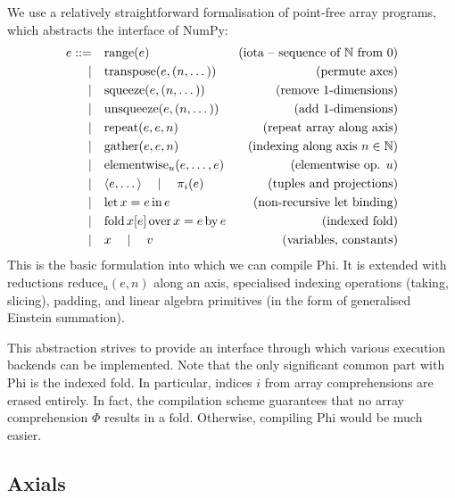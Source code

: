 
We use a relatively straightforward formalisation of point-free array programs, which abstracts the interface of NumPy:
\begin{align*}
e ::=&\quad \mathrm{range}(e)   &\text{(iota -- sequence of }\mathbb N\text{ from }0\text{)} \\
\mid&\quad \mathrm{transpose}(e, (n, \dots)) &\text{(permute axes)} \\ 
\mid&\quad \mathrm{squeeze}(e, (n, \dots)) &\text{(remove 1-dimensions)} \\
\mid&\quad \mathrm{unsqueeze}(e, (n, \dots)) &\text{(add 1-dimensions)} \\
\mid&\quad \mathrm{repeat}(e, e, n) &\text{(repeat array along axis)} \\
\mid&\quad \mathrm{gather}(e, e, n) &\text{(indexing along axis }n \in \mathbb N\text{)} \\ 
\mid&\quad \mathrm{elementwise}_u(e, \dots, e) &\text{(elementwise op. }u\text{)} \\
\mid&\quad \langle e, \dots \rangle \quad\mid\quad \pi_i(e) &\text{(tuples and projections)} \\
\mid&\quad \mathrm{let}\,{x}={e}\,\mathrm{in}\,{e} &\text{(non-recursive let binding)} \\
\mid&\quad \mathrm{fold}\,{x}[{e}]\,\mathrm{over}\,{x} = {e}\,\mathrm{by}\,{e} &\text{(indexed fold)} \\
\mid&\quad x \quad\mid\quad v  &\text{(variables, constants)}
\end{align*}
This is the basic formulation into which we can compile Phi. It is extended with reductions $\mathrm{reduce}_u(e, n)$ along an axis, specialised indexing operations (taking, slicing), padding, and linear algebra primitives (in the form of generalised Einstein summation).

This abstraction strives to provide an interface through which various execution backends can be implemented. Note that the only significant common part with Phi is the indexed fold. In particular, indices $i$ from array comprehensions are erased entirely. In fact, the compilation scheme guarantees that no array comprehension $\Phi$ results in a $\mathrm{fold}$. Otherwise, compiling Phi would be much easier.

\subsection{Axials}

